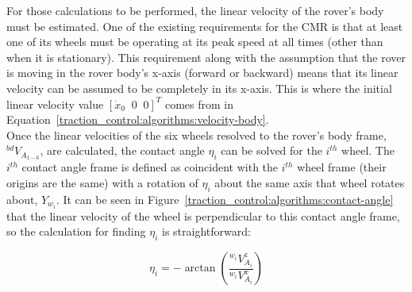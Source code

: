 For those calculations to be performed, the linear velocity of the rover's body must be estimated. One of the existing requirements for the \ac{CMR} is that at least one of its wheels must be operating at its peak speed at all times (other than when it is stationary). This requirement along with the assumption that the rover is moving in the rover body's x-axis (forward or backward) means that its linear velocity can be assumed to be completely in its x-axis. This is where the initial linear velocity value $\left[\dot{x}_0 \;\; 0 \;\; 0\right]^{T}$ comes from in Equation~\ref{traction_control:algorithms:velocity-body}. \\

Once the linear velocities of the six wheels resolved to the rover's body frame, ${}^{bd}V_{A_{1-6}}$, are calculated, the contact angle $\eta_{i}$ can be solved for the $i^{th}$ wheel. The $i^{th}$ contact angle frame is defined as coincident with the $i^{th}$ wheel frame (their origins are the same) with a rotation of $\eta_{i}$ about the same axis that wheel rotates about, $Y_{w_{i}}$. It can be seen in Figure~\ref{traction_control:algorithms:contact-angle} that the linear velocity of the wheel is perpendicular to this contact angle frame, so the calculation for finding $\eta_{i}$ is straightforward:

\begin{equation}
	\eta_{i} = -\arctan\left(\frac{{}^{w_{i}}V^{z}_{A_{i}}}{{}^{w_{i}}V^{x}_{A_{i}}}\right)
\end{equation}